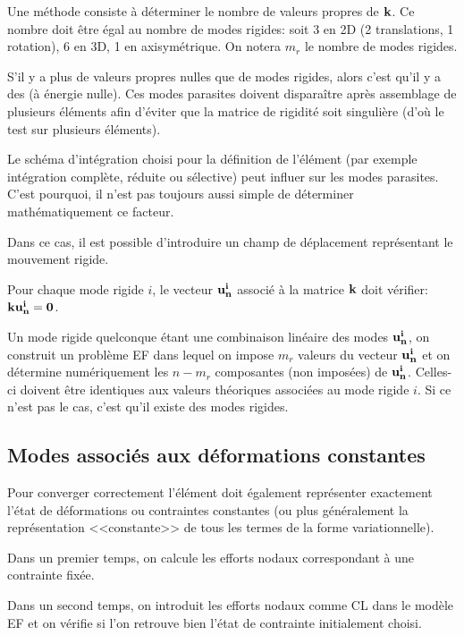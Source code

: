 \medskip
Une méthode consiste à déterminer le nombre de valeurs propres  de $\mathbf{k}$.
Ce nombre doit être égal au nombre de modes rigides: soit 3 en 2D (2 translations, 1 rotation),
6 en 3D, 1 en axisymétrique. On notera $m_r$ le nombre de modes rigides.

S'il y a plus de valeurs propres nulles que de modes rigides, alors c'est qu'il y a des
 (à énergie nulle).
Ces modes parasites doivent disparaître après assemblage de plusieurs éléments
afin d'éviter que la matrice de rigidité soit singulière (d'où le test sur plusieurs éléments).

Le schéma d'intégration choisi pour la définition de l'élément (par exemple intégration 
complète, réduite ou sélective) peut influer sur les modes parasites.
C'est pourquoi, il n'est pas toujours aussi simple de déterminer mathématiquement
ce facteur.

\medskip
Dans ce cas, il est possible d'introduire un champ de déplacement représentant le
mouvement rigide.

Pour chaque mode rigide $i$, le vecteur $\mathbf{u^i_n}$ associé à la matrice $\mathbf{k}$ doit
vérifier: $\mathbf{k}\mathbf{u^i_n}=\mathbf{0}$.

Un mode rigide quelconque étant une combinaison linéaire des modes $\mathbf{u^i_n}$,
on construit un problème EF dans lequel on impose $m_r$ valeurs du vecteur $\mathbf{u^i_n}$
et on détermine numériquement les $n-m_r$ composantes (non imposées) de $\mathbf{u^i_n}$.
Celles-ci doivent être identiques aux valeurs théoriques associées au mode
rigide $i$. Si ce n'est pas le cas, c'est qu'il existe des modes rigides.

\medskip
\subsection{Modes associés aux déformations constantes}

Pour converger correctement l'élément doit également représenter
exactement l'état de déformations ou contraintes constantes (ou plus
généralement la représentation <<constante>> de tous les termes de la
forme variationnelle).

Dans un premier temps, on calcule les efforts nodaux correspondant à une contrainte fixée.

Dans un second temps, on introduit les efforts nodaux comme CL dans le modèle
EF et on vérifie si l'on retrouve bien l'état de contrainte initialement choisi.

\medskip
